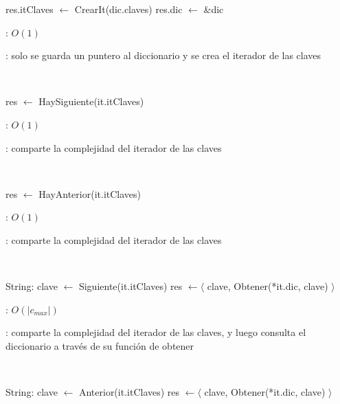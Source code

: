 \begin{Algoritmos}

	\begin{algorithm}[H]
		\NoCaptionOfAlgo
		\caption{}
		res.itClaves $\leftarrow$ CrearIt(dic.claves) 
		res.dic $\leftarrow$ \&dic 
	\end{algorithm}

	\complejidad: $O(1)$

	\justifcomp: solo se guarda un puntero al diccionario y se crea el iterador de las claves

	~

	\begin{algorithm}[H]
		\NoCaptionOfAlgo
		\caption{}
		res $\leftarrow$ HaySiguiente(it.itClaves) 
	\end{algorithm}

	\complejidad: $O(1)$

	\justifcomp: comparte la complejidad del iterador de las claves

	~

	\begin{algorithm}[H]
		\NoCaptionOfAlgo
		\caption{}
		res $\leftarrow$ HayAnterior(it.itClaves) 
	\end{algorithm}

	\complejidad: $O(1)$

	\justifcomp: comparte la complejidad del iterador de las claves

	~

	\begin{algorithm}[H]
		\NoCaptionOfAlgo
		\caption{}
		String: clave $\leftarrow$ Siguiente(it.itClaves) 
		res $\leftarrow \langle$ clave, Obtener(*it.dic, clave) $\rangle$ 
	\end{algorithm}

	\complejidad: $O(|c_{max}|)$

	\justifcomp: comparte la complejidad del iterador de las claves, y luego consulta el diccionario a través de su función de obtener

	~

	\begin{algorithm}[H]
		\NoCaptionOfAlgo
		\caption{}
		String: clave $\leftarrow$ Anterior(it.itClaves) 
		res $\leftarrow \langle$ clave, Obtener(*it.dic, clave) $\rangle$ 
	\end{algorithm}


\end{Algoritmos}
